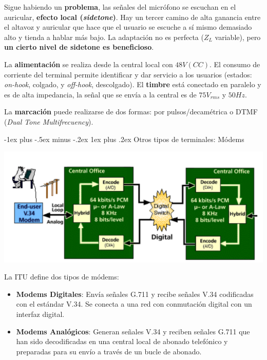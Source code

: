 \documentclass[10pt,portrait, twocolumn]{article}
\makeatletter
\renewcommand{\subsubsection}{\@startsection{subsubsection}{3}{0mm}%
                                {-1ex plus -.5ex minus -.2ex}%
                                {1ex plus .2ex}%
                                {\normalfont\small\bfseries}}
\makeatother
\begin{document}
Sigue habiendo un \textbf{problema}, las señales del micrófono se escuchan en el auricular, \textbf{efecto local (\textit{sidetone})}. Hay un tercer camino de alta ganancia entre el altavoz y auricular que hace que el usuario se escuche a sí mismo demasiado alto y tienda a hablar más bajo. La adaptación no es perfecta ($Z_{L}$ variable), pero \textbf{un cierto nivel de sidetone es beneficioso}.


La \textbf{alimentación} se realiza desde la central local con $48V (CC)$. El consumo de corriente del terminal permite identificar y dar servicio a los usuarios (estados: \textit{on-hook}, colgado, y \textit{off-hook}, descolgado). El \textbf{timbre} está conectado en paralelo y es de alta impedancia, la señal que se envía a la central es de $75 V_{rms}$ y $50Hz$. 


La \textbf{marcación} puede realizarse de dos formas: por pulsos/decamétrica o DTMF (\textit{Dual Tone Multifrecuency}).

\subsubsection{Otros tipos de terminales: Módems}

	\begin{center}
		\includegraphics[scale=0.3]{images/SpecsModem}
	\end{center}

La ITU define dos tipos de módems:

\begin{itemize}
	\item \textbf{Modems Digitales}: Envía señales G.711 y recibe señales V.34 codificadas con el estándar V.34. Se conecta a una red con conmutación digital con un interfaz digital.
	\item \textbf{Modems Analógicos}: Generan señales V.34 y reciben señales G.711 que han sido decodificadas en una central local de abonado telefónico y preparadas para su envío a través de un bucle de abonado.
\end{itemize}
\end{document}
